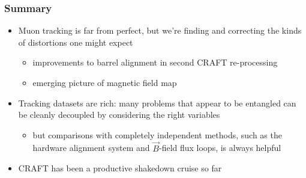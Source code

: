 \documentclass[compress]{beamer}
\begin{document}
\begin{frame}
\frametitle{Summary}
\begin{itemize}\setlength{\itemsep}{0.65 cm}
\item Muon tracking is far from perfect, but we're finding and
  correcting the kinds of distortions one might expect
\begin{itemize}
\item improvements to barrel alignment in second CRAFT re-processing
\item emerging picture of magnetic field map
\end{itemize}

\item Tracking datasets are rich: many problems that appear to be
  entangled can be cleanly decoupled by considering the right
  variables
\begin{itemize}
\item but comparisons with completely independent methods, such as the
  hardware alignment system and $\vec{B}$-field flux loops, is always
  helpful
\end{itemize}

\item CRAFT has been a productive shakedown cruise so far
\end{itemize}
\label{numpages}
\end{frame}
\end{document}
